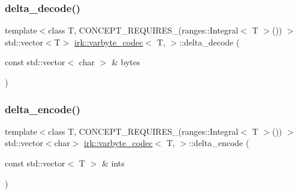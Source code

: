 \subsubsection{\texorpdfstring{delta\+\_\+decode()}{delta\_decode()}\hspace{0.1cm}{\footnotesize\ttfamily [3/3]}}
{\footnotesize\ttfamily template$<$class T, C\+O\+N\+C\+E\+P\+T\+\_\+\+R\+E\+Q\+U\+I\+R\+E\+S\+\_\+(ranges\+::\+Integral$<$ T $>$()) $>$ \\
std\+::vector$<$T$>$ \mbox{\hyperlink{structirk_1_1varbyte__codec}{irk\+::varbyte\+\_\+codec}}$<$ T, $>$\+::delta\+\_\+decode (\begin{DoxyParamCaption}\item[{const std\+::vector$<$ char $>$ \&}]{bytes }\end{DoxyParamCaption})\hspace{0.3cm}{\ttfamily [inline]}}

\mbox{\label{structirk_1_1varbyte__codec_a5f9bba73adbbd513708a1babc8324239}} 
\subsubsection{\texorpdfstring{delta\+\_\+encode()}{delta\_encode()}\hspace{0.1cm}{\footnotesize\ttfamily [1/2]}}
{\footnotesize\ttfamily template$<$class T, C\+O\+N\+C\+E\+P\+T\+\_\+\+R\+E\+Q\+U\+I\+R\+E\+S\+\_\+(ranges\+::\+Integral$<$ T $>$()) $>$ \\
std\+::vector$<$char$>$ \mbox{\hyperlink{structirk_1_1varbyte__codec}{irk\+::varbyte\+\_\+codec}}$<$ T, $>$\+::delta\+\_\+encode (\begin{DoxyParamCaption}\item[{const std\+::vector$<$ T $>$ \&}]{ints }\end{DoxyParamCaption})\hspace{0.3cm}{\ttfamily [inline]}}

\mbox{\label{structirk_1_1varbyte__codec_a191f382522d0e711ee40fa3ab6101335}} 
